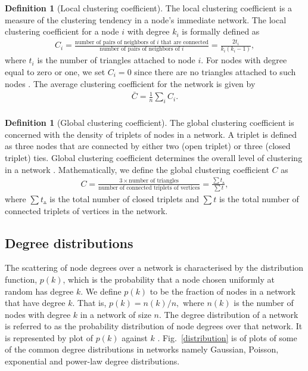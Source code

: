 \documentclass[10pt,a4paper]{article}
\theoremstyle{plain}
\theoremstyle{definition}
\newtheorem{defn}[subsection]{Definition}
\begin{document}
\begin{defn}[Local clustering coefficient]
	The local clustering coefficient is a measure of the clustering tendency in a node's immediate network. The local clustering coefficient for a node $i$ with degree $k_i$ is formally defined as 
	\begin{eqnarray}
	C_i = \frac{\text{number of pairs of neighbors of } i\text{ that are connected}}{\text{number of pairs of neighbors of }i}= \frac{2 t_i}{k_i(k_i-1)},  
	\end{eqnarray}
	where $t_i$ is the number of triangles attached to node $i$. For nodes with degree equal to zero or one, we set $C_i = 0$ since there are no triangles attached to such nodes \citep{newman2010networks}. The average clustering coefficient for the network is given by
	\begin{eqnarray}
	\bar{C} = \frac{1}{n} \sum_i C_i.\\
	\end{eqnarray} 
\end{defn}

\begin{defn}[Global clustering coefficient]
	The global clustering coefficient is concerned with the density of triplets of nodes in a network. A triplet is defined as three nodes that are connected by either two (open triplet) or three (closed triplet) ties. Global clustering coefficient determines the overall level of clustering in a network \citep{opsahl2009clustering}.
	Mathematically, we define the global clustering coefficient $C$ as
	\begin{eqnarray}
	C = \frac{3 \times \text{number of triangles}}{\text{number of connected triplets of vertices}} = \frac{\sum t_\vartriangle}{\sum t},
	\end{eqnarray}
	where $\sum t_\vartriangle$ is the total number of closed triplets and $\sum t$ is the total number of connected triplets of vertices in the network.
\end{defn}

\subsection{Degree distributions}
The scattering of node degrees over a network is characterised by the distribution function, $p(k)$, which is the probability that a node chosen uniformly at random has degree $k$. We define $p(k)$ to be the fraction of nodes in a network that have degree $k$. That is, $p(k) = n(k)/n,$ where $n(k)$ is the number of nodes with degree $k$ in a network of size $n$. The degree distribution of a network is  referred to as the probability distribution of node degrees over that network. It is represented by plot of $p(k)$ against $k$ \citep{estrada2011structure}. Fig.~\ref{distribution} is of plots of some of the common degree distributions in networks namely Gaussian, Poisson, exponential and power-law degree distributions.
\end{document}

